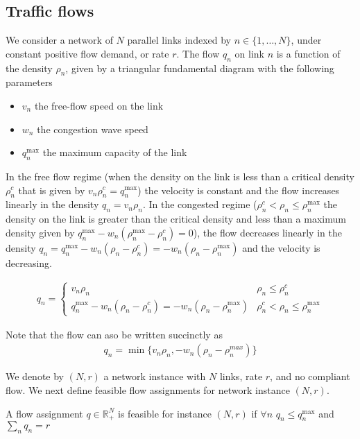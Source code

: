 \subsection{Traffic flows}
We consider a network of $N$ parallel links indexed by $n \in \{1, \dots, N \}$, under constant positive flow demand, or rate $r$. The flow $q_n$ on link $n$ is a function of the density $\rho_n$, given by a triangular fundamental diagram with the following parameters
\begin{itemize}
\item $v_n$ the free-flow speed on the link
\item $w_n$ the congestion wave speed
\item $q_n^{\max}$ the maximum capacity of the link
\end{itemize}
In the free flow regime (when the density on the link is less than a critical density $\rho_n^c$ that is given by $v_n\rho_n^c = q_n^{\max}$) the velocity is constant and the flow increases linearly in the density $q_n = v_n \rho_n$. In the congested regime ($\rho_n^c < \rho_n \leq \rho_n^{\max}$ the density on the link is greater than the critical density and less than a maximum density given by $q_n^{\max} - w_n(\rho_n^{\max} - \rho_n^c) = 0$), the flow decreases linearly in the density $q_n = q_n^{\max} - w_n(\rho_n - \rho_n^c) = - w_n(\rho_n - \rho_n^{\max})$ and the velocity is decreasing.

\begin{align}
\label{eq:flow} q_n = 
\begin{cases}
v_n \rho_n & \rho_n \leq \rho_n^c\\
q_n^{\max} - w_n(\rho_n - \rho_n^c) = - w_n(\rho_n - \rho_n^{\max})  & \rho_n^c < \rho_n \leq \rho_n^{\max}
\end{cases}
\end{align}

Note that the flow can aso be written succinctly as
\begin{align}
\label{eq:flow_min}
q_n = \min \{ v_n \rho_n, - w_n(\rho_n - \rho_n^{max})\}
\end{align}

We denote by $(N, r)$ a network instance with $N$ links, rate $r$, and no compliant flow. We next define feasible flow assignments for network instance $(N, r)$.

\begin{definition}
A flow assignment $q \in \mathbb{R}_+^N$ is feasible for instance $(N, r)$ if $\forall n$ $q_n \leq q_n^{\max}$ and $\sum_n q_n = r$
\end{definition}

